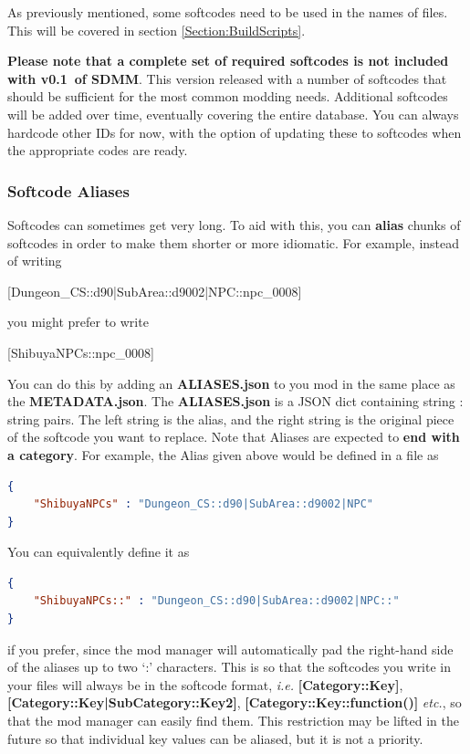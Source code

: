 \documentclass{article}
\newcommand{\cymisversion}{0.1}
\begin{document}
As previously mentioned, some softcodes need to be used in the names of files. This will be covered in section \ref{Section:BuildScripts}.

\textbf{Please note that a complete set of required softcodes is not included with v\cymisversion~of SDMM}. This version released with a number of softcodes that should be sufficient for the most common modding needs. Additional softcodes will be added over time, eventually covering the entire database. You can always hardcode other IDs for now, with the option of updating these to softcodes when the appropriate codes are ready.

\subsubsection{Softcode Aliases}
Softcodes can sometimes get very long. To aid with this, you can \textbf{alias} chunks of softcodes in order to make them shorter or more idiomatic. For example, instead of writing
\begin{center}
	[Dungeon\_CS::d90|SubArea::d9002|NPC::npc\_0008]
\end{center}
you might prefer to write
\begin{center}
	[ShibuyaNPCs::npc\_0008]
\end{center}
You can do this by adding an \textbf{ALIASES.json} to you mod in the same place as the \textbf{METADATA.json}. The \textbf{ALIASES.json} is a JSON dict containing string : string pairs. The left string is the alias, and the right string is the original piece of the softcode you want to replace. Note that Aliases are expected to \textbf{end with a category}. For example, the Alias given above would be defined in a file as
\begin{lstlisting}[language=json,firstnumber=1]
{
    "ShibuyaNPCs" : "Dungeon_CS::d90|SubArea::d9002|NPC"
}
\end{lstlisting}

\noindent You can equivalently define it as
\begin{lstlisting}[language=json,firstnumber=1]
{
    "ShibuyaNPCs::" : "Dungeon_CS::d90|SubArea::d9002|NPC::"
}
\end{lstlisting}

\noindent if you prefer, since the mod manager will automatically pad the right-hand side of the aliases up to two `:' characters. This is so that the softcodes you write in your files will always be in the softcode format, \textit{i.e.} \textbf{[Category::Key]}, \textbf{[Category::Key|SubCategory::Key2]}, \textbf{[Category::Key::function()]} \textit{etc.}, so that the mod manager can easily find them. This restriction may be lifted in the future so that individual key values can be aliased, but it is not a priority.
\end{document}
